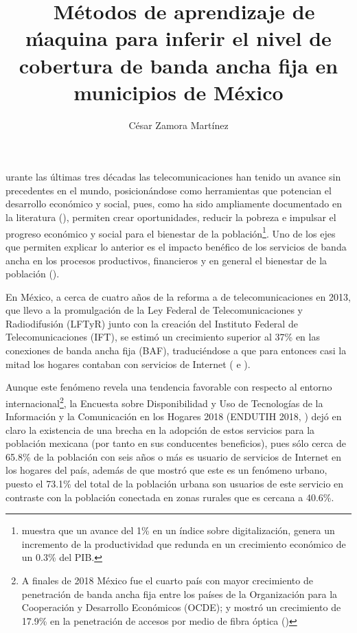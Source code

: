 \documentclass[9pt,twocolumn,twoside]{ilcss}
\title{\ M\'etodos de aprendizaje de \'maquina para inferir el nivel de cobertura de banda ancha fija en municipios  de M\'exico}
\author[a]{C\'esar Zamora Mart\'inez}
\affil[a]{Alumno de Maestr\'ia en Ciencias de Datos (ITAM)}
\begin{document}
\maketitle
\thispagestyle{firststyle}


urante las últimas tres décadas las telecomunicaciones han tenido un avance sin precedentes en el mundo, posicionándose como herramientas que potencian el desarrollo económico y social, pues, como ha sido ampliamente documentado en la literatura (\cite{PRADHAN2014634}), permiten crear oportunidades, reducir la pobreza e impulsar el progreso económico y social para el bienestar de la población\footnote{\cite{Katz2018} muestra que un avance del 1\% en un índice sobre digitalización, genera un incremento de la productividad que redunda en un crecimiento económico de un 0.3\% del PIB. }. Uno de los ejes que permiten explicar lo anterior es el impacto benéfico de los servicios de banda ancha en los procesos productivos, financieros y en general el bienestar de la población (\cite{Katz2012}).

En México, a cerca de cuatro años de la reforma a de telecomunicaciones en 2013, que llevo a la promulgación de la Ley Federal de Telecomunicaciones y Radiodifusión (LFTyR) junto con la creación del Instituto Federal de Telecomunicaciones (IFT), se estimó un crecimiento superior al 37\% en las conexiones de banda ancha fija (BAF), traduciéndose a que para entonces casi la mitad los hogares contaban con servicios de Internet (\cite{IFT2017} e \cite{IFT2018}).

Aunque este fenómeno revela una tendencia favorable con respecto al entorno internacional\footnote{A finales de 2018 México fue el cuarto país con mayor crecimiento de penetración de banda ancha fija entre los países de la Organización para la Cooperación y Desarrollo Económicos (OCDE); y mostró un crecimiento de 17.9\% en la penetración de accesos por medio de fibra óptica (\cite{IFT2019})}, la Encuesta sobre Disponibilidad y Uso de Tecnologías de la Información y la Comunicación en los Hogares 2018 (ENDUTIH 2018, \cite{ENDUTIH2018}) dejó en claro la existencia de una brecha en la adopción de estos servicios para la población mexicana (por tanto en sus conducentes beneficios), pues sólo cerca de 65.8\% de la población con seis años o más es usuario de servicios de Internet en los hogares del país, además de que mostró que este es un fenómeno urbano, puesto el 73.1\% del total de la población urbana son usuarios de este servicio en contraste con la población conectada en zonas rurales que es cercana a 40.6\%.
\end{document}
